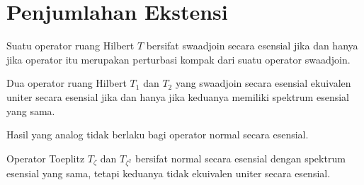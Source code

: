 \section{Penjumlahan Ekstensi}

\begin{center}
\end{center}

\begin{prop} Suatu operator ruang Hilbert $T$ bersifat swaadjoin secara esensial jika dan hanya jika
operator itu merupakan perturbasi kompak dari suatu operator swaadjoin.
\end{prop}

\begin{prop}\label{005414} Dua operator ruang Hilbert $T_1$ dan $T_2$ yang swaadjoin secara esensial
ekuivalen uniter secara esensial jika dan hanya jika keduanya memiliki spektrum esensial yang
sama.
\end{prop}

Hasil yang analog tidak berlaku bagi operator normal secara esensial.

\begin{exam} Operator Toeplitz $T_\zeta$ dan $T_{\zeta^2}$ bersifat normal secara esensial dengan
spektrum esensial yang sama, tetapi keduanya tidak ekuivalen uniter secara esensial.
\end{exam}


